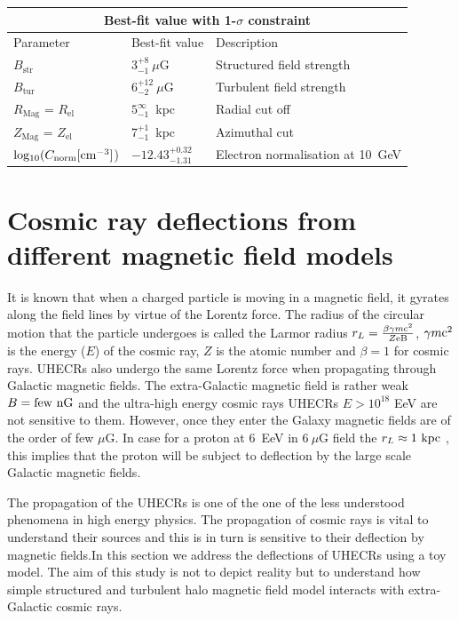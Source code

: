 \documentclass[12pt, a4 paper]{article}
\begin{document}
\newpage
\label{Para_table}
\begin{center}
\begin{tabular}{ |p{}|p{4.5cm}|p{6.5cm}|  }
\hline
\multicolumn{3}{|c|}{Best-fit value with 1-$\sigma$ constraint} \\
\hline
Parameter & Best-fit value &Description \\
\hline
\hline
$B_{\mathrm{str}} $& $3_{-1}^{+8} ~ \mu$G & Structured field strength \\
\hline
$B_{\mathrm{tur}} $& $ 6_{-2}^{+12} ~\mu$G & Turbulent field strength\\
\hline
$R_{\mathrm{Mag}}$ = $R_{\mathrm{el}}$ & $5_{-1}^{\infty}$~kpc & Radial cut off \\
\hline
$Z_{\mathrm{Mag}}$ = $Z_{\mathrm{el}}$ & $7_{-1}^{+1}$~kpc & Azimuthal cut\\
\hline
${\rm{log_{10}}}(C_{\rm norm} [{\rm cm}^{-3}]$) & ${-12.43}_{{-1.31}}^{{+0.32}}$ & Electron normalisation at 10~GeV\\
\hline
\end{tabular}

\end{center}


\section{Cosmic ray deflections from different magnetic field models}
\label{Deflections}

It is known that when a charged particle is moving in a magnetic field, it gyrates along the field lines by virtue of the Lorentz force. The radius of the circular motion that the particle undergoes is called the Larmor radius $r_L = \frac{\beta \gamma m\rm{c^2}}{Z\rm {e}B}$, $\gamma m\rm{c^2}$ is the energy ($E$) of the cosmic ray, $Z$ is the atomic number and $\beta = 1$ for cosmic rays. 
UHECRs also undergo the same Lorentz force when propagating through Galactic magnetic fields. The extra-Galactic magnetic field is rather weak $B = \rm few ~ nG$ and the ultra-high energy cosmic rays UHECRs $E > 10^{18}$ EeV are not sensitive to them. However, once they enter the Galaxy magnetic fields are of the order of few $\mu$G. In case for a proton at 6~EeV in $6~\mu$G field the $r_L \approx 1 ~ \rm kpc$ , this implies that the proton will be subject to deflection by the large scale Galactic magnetic fields.


The propagation of the UHECRs is one of the one of the less understood phenomena in high energy physics. The propagation of cosmic rays is vital to understand their sources and this is in turn is sensitive to their deflection by magnetic fields.In this section we address the deflections of UHECRs using a toy model. The aim of this study is not to depict reality but to understand how simple structured and turbulent halo magnetic field model interacts with extra-Galactic cosmic rays. 
\end{document}
